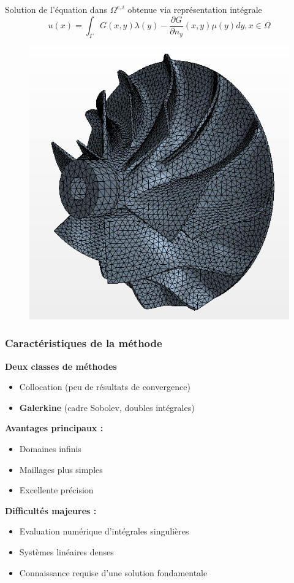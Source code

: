 \documentclass[11pt]{beamer}
\begin{document}
\begin{frame}
\begin{minipage}{0.69\textwidth}
			Solution de l'équation dans $\Omega^{e,i}$ obtenue via représentation intégrale
			\[ u(x) = \int_{\Gamma}G(x,y) \lambda(y) -  \dfrac{\partial G}{\partial n_y}(x,y)\mu(y) dy, x \in \Omega\]
		\end{minipage}
		\begin{minipage}{0.29\textwidth}
		\begin{figure}
			\flushright
			\includegraphics[scale = 0.15]{surfaceMesh}
		\end{figure}
		\end{minipage}
	\end{frame}
	\begin{frame}
		\frametitle{Caractéristiques de la méthode}
		\textbf{Deux classes de méthodes}
		\begin{itemize}
			\item Collocation (peu de résultats de convergence)
			\item \textbf{Galerkine} (cadre Sobolev, doubles intégrales)
		\end{itemize}
		\textbf{Avantages principaux :}
		\begin{itemize}
			\item Domaines infinis
			\item Maillages plus simples 
			\item Excellente précision 
		\end{itemize}
		\textbf{Difficultés majeures :}
		\begin{itemize}
			\item Evaluation numérique d'intégrales singulières
			\item Systèmes linéaires denses
			\item Connaissance requise d'une solution fondamentale
		\end{itemize}
		
	\end{frame}
\end{document}
